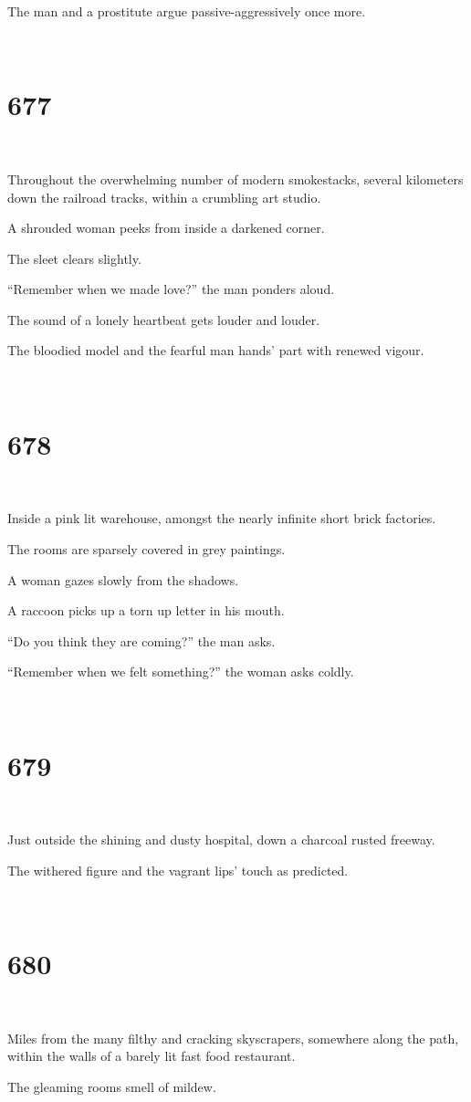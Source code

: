 \documentclass{report}
\begin{document}
The man and a prostitute argue passive-aggressively once more.

~
\chapter*{677}
~

Throughout the overwhelming number of modern smokestacks, several kilometers down the railroad tracks, within a crumbling art studio.

A shrouded woman peeks from inside a darkened corner.

The sleet clears slightly.

``Remember when we made love?'' the man ponders aloud.

The sound of a lonely heartbeat gets louder and louder.

The bloodied model and the fearful man hands' part with renewed vigour.

~
\chapter*{678}
~

Inside a pink lit warehouse, amongst the nearly infinite short brick factories.

The rooms are sparsely covered in grey paintings.

A woman gazes slowly from the shadows.

A raccoon picks up a torn up letter in his mouth.

``Do you think they are coming?'' the man asks.

``Remember when we felt something?'' the woman asks coldly.

~
\chapter*{679}
~

Just outside the shining and dusty hospital, down a charcoal rusted freeway.

The withered figure and the vagrant lips' touch as predicted.

~
\chapter*{680}
~

Miles from the many filthy and cracking skyscrapers, somewhere along the path, within the walls of a barely lit fast food restaurant.

The gleaming rooms smell of mildew.
\end{document}
